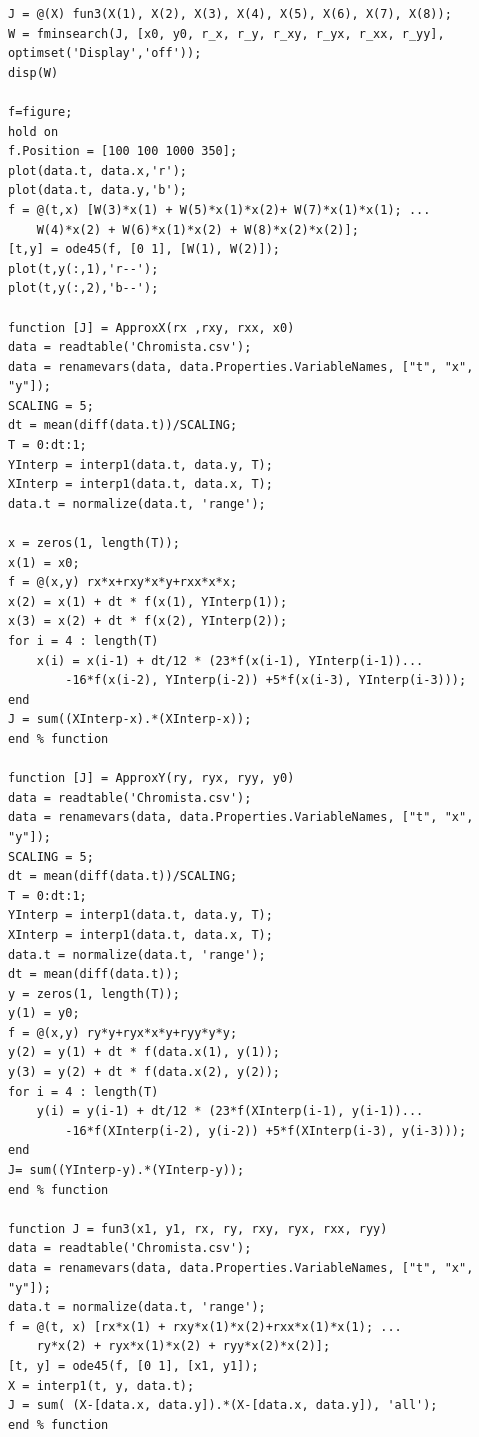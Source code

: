 \documentclass[12pt]{article}
\begin{document}
\begin{lstlisting}[caption=Zadanie 3]
J = @(X) fun3(X(1), X(2), X(3), X(4), X(5), X(6), X(7), X(8));
W = fminsearch(J, [x0, y0, r_x, r_y, r_xy, r_yx, r_xx, r_yy], optimset('Display','off'));
disp(W)

f=figure;
hold on
f.Position = [100 100 1000 350];
plot(data.t, data.x,'r');
plot(data.t, data.y,'b');
f = @(t,x) [W(3)*x(1) + W(5)*x(1)*x(2)+ W(7)*x(1)*x(1); ...
    W(4)*x(2) + W(6)*x(1)*x(2) + W(8)*x(2)*x(2)];
[t,y] = ode45(f, [0 1], [W(1), W(2)]);
plot(t,y(:,1),'r--');
plot(t,y(:,2),'b--');

function [J] = ApproxX(rx ,rxy, rxx, x0)
data = readtable('Chromista.csv');
data = renamevars(data, data.Properties.VariableNames, ["t", "x", "y"]);
SCALING = 5;
dt = mean(diff(data.t))/SCALING;
T = 0:dt:1;
YInterp = interp1(data.t, data.y, T);
XInterp = interp1(data.t, data.x, T);
data.t = normalize(data.t, 'range');

x = zeros(1, length(T));
x(1) = x0;
f = @(x,y) rx*x+rxy*x*y+rxx*x*x;
x(2) = x(1) + dt * f(x(1), YInterp(1));
x(3) = x(2) + dt * f(x(2), YInterp(2));
for i = 4 : length(T)
    x(i) = x(i-1) + dt/12 * (23*f(x(i-1), YInterp(i-1))...
        -16*f(x(i-2), YInterp(i-2)) +5*f(x(i-3), YInterp(i-3)));
end
J = sum((XInterp-x).*(XInterp-x));
end % function

function [J] = ApproxY(ry, ryx, ryy, y0)
data = readtable('Chromista.csv');
data = renamevars(data, data.Properties.VariableNames, ["t", "x", "y"]);
SCALING = 5;
dt = mean(diff(data.t))/SCALING;
T = 0:dt:1;
YInterp = interp1(data.t, data.y, T);
XInterp = interp1(data.t, data.x, T);
data.t = normalize(data.t, 'range');
dt = mean(diff(data.t));
y = zeros(1, length(T));
y(1) = y0;
f = @(x,y) ry*y+ryx*x*y+ryy*y*y;
y(2) = y(1) + dt * f(data.x(1), y(1));
y(3) = y(2) + dt * f(data.x(2), y(2));
for i = 4 : length(T)
    y(i) = y(i-1) + dt/12 * (23*f(XInterp(i-1), y(i-1))...
        -16*f(XInterp(i-2), y(i-2)) +5*f(XInterp(i-3), y(i-3)));
end
J= sum((YInterp-y).*(YInterp-y));
end % function

function J = fun3(x1, y1, rx, ry, rxy, ryx, rxx, ryy)
data = readtable('Chromista.csv');
data = renamevars(data, data.Properties.VariableNames, ["t", "x", "y"]);
data.t = normalize(data.t, 'range');
f = @(t, x) [rx*x(1) + rxy*x(1)*x(2)+rxx*x(1)*x(1); ...
    ry*x(2) + ryx*x(1)*x(2) + ryy*x(2)*x(2)];
[t, y] = ode45(f, [0 1], [x1, y1]);
X = interp1(t, y, data.t);
J = sum( (X-[data.x, data.y]).*(X-[data.x, data.y]), 'all');
end % function
\end{lstlisting}
\end{document}

